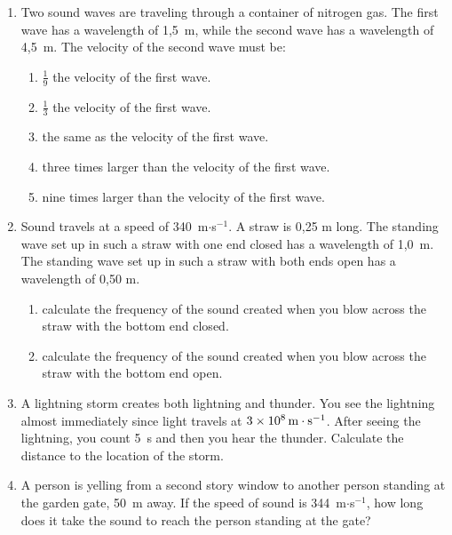 \begin{enumerate}[noitemsep, label=\textbf{\arabic*}. ]
\begin{enumerate}[noitemsep, label=\textbf{\alph*}. ]
\end{enumerate}
                \label{m38800*uid82}\item Two sound waves are traveling through a container of nitrogen gas. The first wave has a wavelength of 1,5~m, while the second wave has a wavelength of 4,5~m. The velocity of the second wave must be:
\label{m38800*id187073}\begin{enumerate}[noitemsep, label=\textbf{\alph*}. ] 
            \label{m38800*uid83}\item $\frac{1}{9}$ the velocity of the first wave.
\label{m38800*uid84}\item $\frac{1}{3}$ the velocity of the first wave.
\label{m38800*uid85}\item the same as the velocity of the first wave.
\label{m38800*uid86}\item three times larger than the velocity of the first wave.
\label{m38800*uid87}\item nine times larger than the velocity of the first wave.
\end{enumerate}
                \label{m38800*uid88}\item Sound travels at a speed of 340~m$\ensuremath{\cdot}$s${}^{-1}$. A straw is 0,25 m long. The standing wave set up in such a straw with one end closed has a wavelength of 1,0~m. The standing wave set up in such a straw with both ends open has a wavelength of 0,50 m.
\label{m38800*id187205}\begin{enumerate}[noitemsep, label=\textbf{\alph*}. ] 
            \label{m38800*uid89}\item calculate the frequency of the sound created when you blow across the straw with the bottom end closed.
\label{m38800*uid90}\item calculate the frequency of the sound created when you blow across the straw with the bottom end open.
\end{enumerate}
                \label{m38800*uid91}\item A lightning storm creates both lightning and thunder. You see the lightning almost immediately since light travels at $3\ensuremath{\times}{10}^{8}\phantom{\rule{0.166667em}{0ex}}\mathrm{m}\ensuremath{\cdot}{\mathrm{s}}^{-1}$. After seeing the lightning, you count 5~s and then you hear the thunder. Calculate the distance to the location of the storm.\newline
\label{m38800*uid92}\item A person is yelling from a second story window to another person standing at the garden gate, 50~m away. If the speed of sound is 344~m$\ensuremath{\cdot}$s${}^{-1}$, how long does it take the sound to reach the person standing at the gate?\newline

\end{enumerate}
